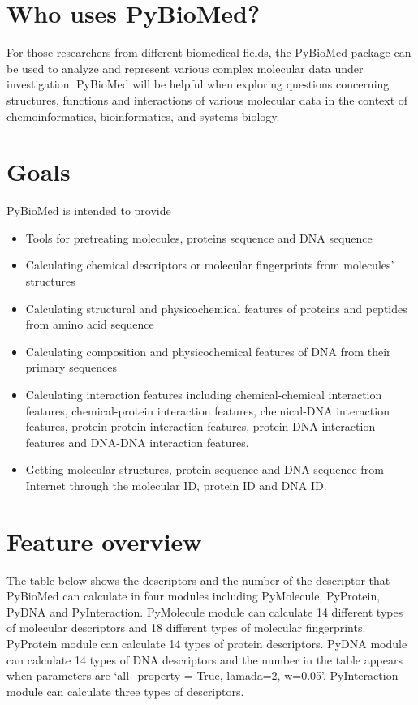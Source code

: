 \documentclass[letterpaper,10pt,english]{sphinxmanual}
\begin{document}
\section{Who uses PyBioMed?}
\label{overview:who-uses-pybiomed}
For those researchers from different biomedical fields, the PyBioMed package can be used to analyze and represent various complex molecular data under investigation. PyBioMed will be helpful when exploring questions concerning structures, functions and interactions of various molecular data in the context of chemoinformatics, bioinformatics, and systems biology.


\section{Goals}
\label{overview:goals}
PyBioMed is intended to provide
\begin{itemize}
\item {} 
Tools for pretreating molecules, proteins sequence and DNA sequence

\item {} 
Calculating chemical descriptors or molecular fingerprints from
molecules' structures

\item {} 
Calculating structural and physicochemical features of proteins and peptides
from amino acid sequence

\item {} 
Calculating composition and physicochemical features of DNA
from their primary sequences

\item {} 
Calculating interaction features including chemical-chemical interaction features,
chemical-protein interaction features, chemical-DNA interaction features,
protein-protein interaction features, protein-DNA interaction features
and DNA-DNA interaction features.

\item {} 
Getting molecular structures, protein sequence and DNA sequence from Internet through
the molecular ID, protein ID and DNA ID.

\end{itemize}


\section{Feature overview}
\label{overview:feature-overview}
The table below shows the descriptors and the number of the descriptor that PyBioMed can calculate in four modules including PyMolecule, PyProtein, PyDNA and PyInteraction. PyMolecule module can calculate 14 different types of molecular descriptors and 18 different types of molecular fingerprints. PyProtein module can calculate 14 types of protein descriptors. PyDNA module can calculate 14 types of DNA descriptors and the number in the table appears when parameters are `all\_property = True, lamada=2, w=0.05'. PyInteraction module can calculate three types of descriptors.
\end{document}
